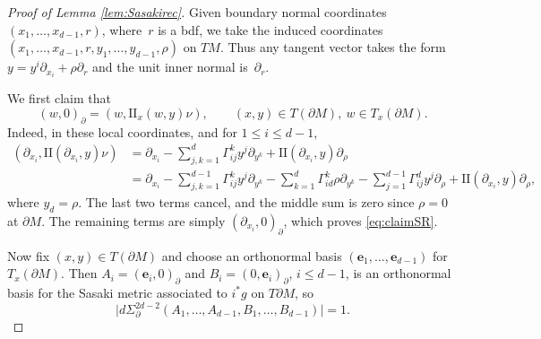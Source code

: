 \documentclass[11pt]{article}
\theoremstyle{plain}
\theoremstyle{definition}
\theoremstyle{remark}
\def\two{\mathrm{II}}
\newcommand{\be}{{\boldsymbol{e}}}
\newcommand{\del}{\partial}
\begin{document}
\begin{proof}[Proof of Lemma \ref{lem:Sasakirec}] Given boundary normal coordinates $(x_1,\dots,x_{d-1},r)$, where~$r$ is a bdf,
we take the induced coordinates $(x_1,\dots,x_{d-1}, r, y_1, \dots, y_{d-1}, \rho)$ on $TM$. Thus any tangent vector takes the
form $y \!=\! y^i \partial_{x_i} \!+\! \rho \partial_r$ and the unit inner normal is~$\partial_r$.

We first claim that\vspace*{-3pt}
\begin{equation}
(w,0)_\partial = (w, \two_x(w,y)\nu), \qquad (x,y)\in T(\partial M),\ w\in T_x(\partial M).
\label{eq:claimSR}
\end{equation}
Indeed, in these local coordinates, and for $1\le i\le d-1$,\vspace*{-3pt}
\begin{align*}
(\partial_{x_i}, \two(\partial_{x_i},y)\nu) &= \partial_{x_i} - \sum_{j,k=1}^d \Gamma_{ij}^k y^j \partial_{y^k} + \two(\partial_{x_i},y) \partial_\rho \\[-2pt]
&= \partial_{x_i} - \sum_{j,k=1}^{d-1} \Gamma_{ij}^k y^j \partial_{y^k} - \sum_{k=1}^{d} \Gamma_{id}^k \rho \partial_{y^k} - \sum_{j=1}^{d-1} \Gamma_{ij}^d y^j \partial_\rho + \two(\partial_{x_i},y) \partial_\rho,
\end{align*}
where $y_d = \rho$. The last two terms cancel, and the middle sum is zero since $\rho=0$ at $\del M$. The remaining terms are simply $(\partial_{x_i},0)_\partial$, which
proves \eqref{eq:claimSR}.

Now fix $(x,y)\in T(\partial M)$ and choose an orthonormal basis $(\be_1, \dots, \be_{d-1})$ for $T_x(\partial M)$.
Then $A_i = (\be_i, 0)_\partial$ and $B_i = (0,\be_i)_\partial$, $i \leq d-1$, is an orthonormal basis for the Sasaki metric associated to
$i^* g$ on $T \partial M$, so
\begin{equation*}
\bigl|d\Sigma_{\partial}^{2d-2}(A_1,\dots,A_{d-1}, B_1, \dots, B_{d-1})\bigr| = 1.
\end{equation*}


\end{proof}
\end{document}

